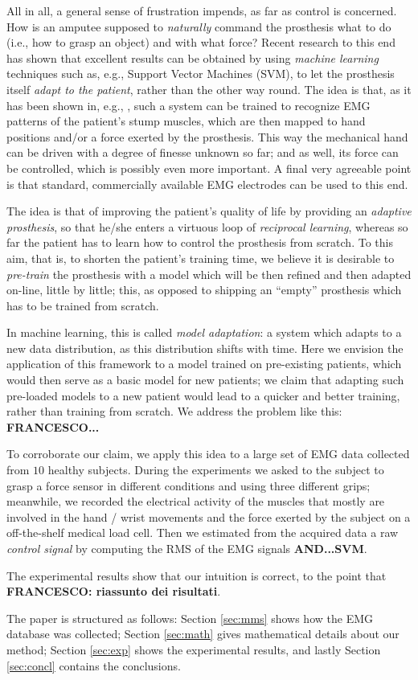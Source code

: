 All in all, a general sense of frustration impends, as far as control
is concerned. How is an amputee supposed to \emph{naturally} command
the prosthesis what to do (i.e., how to grasp an object) and with what
force? Recent research to this end has shown that excellent results
can be obtained by using \emph{machine learning} techniques such as,
e.g., Support Vector Machines (SVM), to let the prosthesis itself
\emph{adapt to the patient}, rather than the other way round. The idea
is that, as it has been shown in, e.g.,
\cite{smagt,dunlop,2008.ICRA,2008.BioCyb,Sebelius2005}, such a system
can be trained to recognize EMG patterns of the patient's stump
muscles, which are then mapped to hand positions and/or a force
exerted by the prosthesis. This way the mechanical hand can be driven
with a degree of finesse unknown so far; and as well, its force can be
controlled, which is possibly even more important. A final very
agreeable point is that standard, commercially available EMG
electrodes can be used to this end.

The idea is that of improving the patient's quality of life by
providing an \emph{adaptive prosthesis}, so that he/she enters a
virtuous loop of \emph{reciprocal learning}, whereas so far the
patient has to learn how to control the prosthesis from scratch. To
this aim, that is, to shorten the patient's training time, we believe it is
desirable to \emph{pre-train} the prosthesis with a model which will
be then refined and then adapted on-line, little by little; this, as
opposed to shipping an ``empty'' prosthesis which has to be trained
from scratch.

In machine learning, this is called \emph{model adaptation}: a system
which adapts to a new data distribution, as this distribution shifts
with time. Here we envision the application of this framework to a
model trained on pre-existing patients, which would then serve as a
basic model for new patients; we claim that adapting such pre-loaded
models to a new patient would lead to a quicker and better training,
rather than training from scratch. We address the problem like this:
\textbf{FRANCESCO...}

To corroborate our claim, we apply this idea to a large set of EMG
data collected from $10$ healthy subjects. During the experiments 
we asked to the subject to grasp a force sensor in different 
conditions and using three different grips; meanwhile, we  
recorded the electrical activity of the muscles that mostly are
involved in the hand / wrist movements and the force exerted by 
the subject on a off-the-shelf medical load cell. Then we estimated
from the acquired data a raw \emph{control signal} by computing the
RMS of the EMG signals \textbf{AND...SVM}.

The experimental results
show that our intuition is correct, to the point that
\textbf{FRANCESCO: riassunto dei risultati}.

The paper is structured as follows: Section \ref{sec:mms} shows how
the EMG database was collected; Section \ref{sec:math} gives
mathematical details about our method; Section \ref{sec:exp} shows the
experimental results, and lastly Section \ref{sec:concl} contains the
conclusions.
